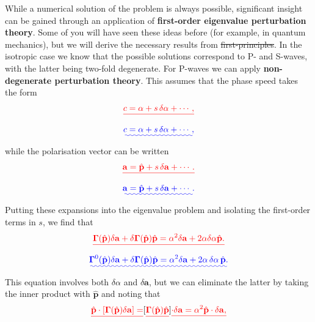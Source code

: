 \documentclass [a4paper,12pt]{paper}
\providecommand{\DIFadd}[1]{{\protect\color{blue}\uwave{#1}}} %
\providecommand{\DIFdel}[1]{{\protect\color{red}\sout{#1}}}                      %
\providecommand{\DIFaddbegin}{} %
\providecommand{\DIFaddend}{} %
\providecommand{\DIFdelbegin}{} %
\providecommand{\DIFdelend}{} %
\begin{document}
While a numerical solution of the problem is always possible, significant insight 
can be gained through an application of \textbf{first-order eigenvalue perturbation theory}. Some of you will have seen these 
ideas before (for example, in quantum mechanics), but we will derive the necessary results from \DIFdelbegin \DIFdel{first-principles}\DIFdelend \DIFaddbegin \DIFadd{first principles}\DIFaddend . 
In the isotropic case we know that the possible solutions correspond to P- and S-waves, with the latter being two-fold degenerate. 
For P-waves we can apply \textbf{non-degenerate perturbation theory}. This assumes that the phase speed takes the form
\DIFdelbegin \begin{displaymath}
\DIFdel{c=\alpha+s\,\delta\alpha+\cdots,
}\end{displaymath}%
\DIFdelend \DIFaddbegin \begin{equation}
\DIFadd{c=\alpha+s\,\delta\alpha+\cdots,
\label{eq:34}
}\end{equation}\DIFaddend 
while the polarisation vector can be written
\DIFdelbegin \begin{displaymath}
\DIFdel{\mathbf{a}=\hat{\mathbf{p}}+s\,\delta \mathbf{a}+\cdots.
}\end{displaymath}%
\DIFdelend \DIFaddbegin \begin{equation}
\DIFadd{\mathbf{a}=\hat{\mathbf{p}}+s\,\delta \mathbf{a}+\cdots.
\label{eq:35}
}\end{equation}\DIFaddend 
Putting these expansions into the eigenvalue problem and isolating the first-order terms in $s$, we find that
\DIFdelbegin \begin{displaymath}
\DIFdel{\bm{\Gamma}(\hat{\mathbf{p}})\delta \mathbf{a}+\delta\bm{\Gamma}(\hat{\mathbf{p}})\hat{\mathbf{p}}=\alpha^{2}\delta 
\mathbf{a}+2\alpha\delta\alpha\hat{\mathbf{p}}.
}\end{displaymath}%
\DIFdelend \DIFaddbegin \begin{equation}
\DIFadd{\bm{\Gamma}^{0}(\hat{\mathbf{p}})\delta \mathbf{a}+\delta\bm{\Gamma}(\hat{\mathbf{p}})\hat{\mathbf{p}}=\alpha^{2}\delta 
\mathbf{a}+2\alpha\,\delta\alpha\,\hat{\mathbf{p}}.
\label{eq:36}
}\end{equation}\DIFaddend 
This equation involves both $\delta\alpha$ and $\delta \mathbf{a}$, but we can eliminate the latter by taking the inner product 
with $\hat{\mathbf{p}}$ and noting that
\DIFdelbegin \begin{displaymath}
\DIFdel{\hat{\mathbf{p}}\cdot[\bm{\Gamma}(\hat{\mathbf{p}})\delta \mathbf{a}]=}[\DIFdel{\bm{\Gamma}(\hat{\mathbf{p}})\hat{\mathbf{p}}}]\DIFdel{\cdot\delta
 \mathbf{a}=\alpha^{2}\hat{\mathbf{p}}\cdot\delta \mathbf{a}, 
}\end{displaymath}%
\end{document}
